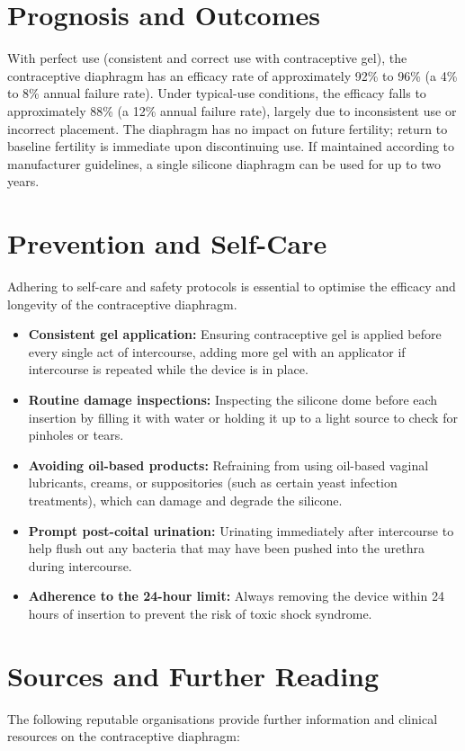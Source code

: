 \section*{Prognosis and Outcomes}
With perfect use (consistent and correct use with contraceptive gel), the contraceptive diaphragm has an efficacy rate of approximately 92\% to 96\% (a 4\% to 8\% annual failure rate). Under typical-use conditions, the efficacy falls to approximately 88\% (a 12\% annual failure rate), largely due to inconsistent use or incorrect placement. The diaphragm has no impact on future fertility; return to baseline fertility is immediate upon discontinuing use. If maintained according to manufacturer guidelines, a single silicone diaphragm can be used for up to two years.

\section*{Prevention and Self-Care}
Adhering to self-care and safety protocols is essential to optimise the efficacy and longevity of the contraceptive diaphragm.

\begin{itemize}
    \item \textbf{Consistent gel application:} Ensuring contraceptive gel is applied before every single act of intercourse, adding more gel with an applicator if intercourse is repeated while the device is in place.
    \item \textbf{Routine damage inspections:} Inspecting the silicone dome before each insertion by filling it with water or holding it up to a light source to check for pinholes or tears.
    \item \textbf{Avoiding oil-based products:} Refraining from using oil-based vaginal lubricants, creams, or suppositories (such as certain yeast infection treatments), which can damage and degrade the silicone.
    \item \textbf{Prompt post-coital urination:} Urinating immediately after intercourse to help flush out any bacteria that may have been pushed into the urethra during intercourse.
    \item \textbf{Adherence to the 24-hour limit:} Always removing the device within 24 hours of insertion to prevent the risk of toxic shock syndrome.
\end{itemize}

\section*{Sources and Further Reading}
The following reputable organisations provide further information and clinical resources on the contraceptive diaphragm:

